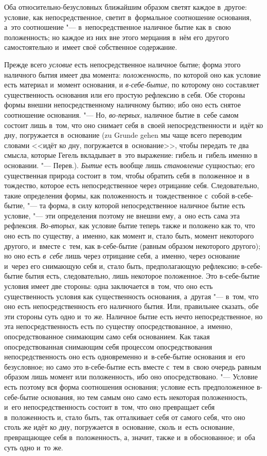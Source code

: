 
Оба относительно-безусловных ближайшим образом
светят каждое в~другое: условие, как непосредственное, светит в~формальное
соотношение основания, а~это соотношение "--- в~непосредственное наличное
бытие как в~свою положенность; но каждое из них вне этого мерцания в~нём
его другого самостоятельно и~имеет своё собственное содержание.

Прежде всего {\em условие} есть непосредственное
наличное бытие; форма этого наличного бытия имеет два момента:
{\em положенность,} по которой оно как условие есть
материал и~момент основания, и {\em в-себе-бытие,} по
которому оно составляет существенность основания или его простую рефлексию
в себя. Обе стороны формы внешни непосредственному наличному бытию; ибо оно
есть снятое соотношение основания. "--- Но,
{\em во-первых,} наличное бытие в~себе самом состоит
лишь в~том, что оно снимает себя в~своей непосредственности и~идёт ко дну,
погружается в~основание (zu Grunde gehen мы чаще всего переводим словами
<<идёт ко дну, погружается в~основание>>, чтобы передать те два смысла,
которые Гегель вкладывает в~это выражение: гибель и~гибель именно в
основании. "--- Перев.). {\em Бытие} есть вообще лишь
{\em становление} сущностью; его существенная природа
состоит в~том, чтобы обратить себя в~положенное и~в тождество, которое есть
непосредственное через отрицание себя. Следовательно, такие определения
формы, как положенность и~тождественное с~собой в-себе-бытие, "--- та форма, в
силу которой непосредственное наличное бытие есть условие, "--- эти
определения поэтому не внешни ему, а~оно есть сама эта рефлексия.
{\em Во-вторых,} как условие бытие теперь также и
положено как то, что оно есть по существу, а~именно, как момент и, стало
быть, момент некоторого другого, и~вместе с~тем, как в-себе-бытие (равным
образом некоторого другого); но оно есть {\em в~себе}
лишь через отрицание себя, а~именно, через основание и~через его снимающую
себя и, стало быть, предполагающую рефлексию; в-себе-бытие бытия есть,
следовательно, лишь некоторое положенное. Это в-себе-бытие условия имеет
две стороны: одна заключается в~том, что оно есть существенность условия
как существенность основания, а~другая "--- в~том, что оно есть
непосредственность его наличного бытия. Или, правильнее сказать, обе эти
стороны суть одно и~то же. Наличное бытие есть нечто непосредственное, но
эта непосредственность есть по существу опосредствованное, а~именно,
опосредствованное снимающим само себя основанием. Как такая
опосредствованная снимающим себя процессом опосредствования
непосредственность оно есть одновременно и~в-себе-бытие основания и~его
безусловное; но само это в-себе-бытие есть вместе с~тем в~свою очередь
равным образом лишь момент или положенность, ибо оно опосредствовано. "---
Условие есть поэтому вся форма соотношения основания; условие есть
предположенное в-себе-бытие основания, но тем самым оно само есть некоторая
положенность, и~его непосредственность состоит в~том, что оно превращает
себя в~положенность и, стало быть, так отталкивает себя от самого себя, что
оно столь же идёт ко дну, погружается в~основание, сколь и~есть основание,
превращающее себя в~положенность, а, значит, также и~в обоснованное; и~оба
суть одно и~то же.


